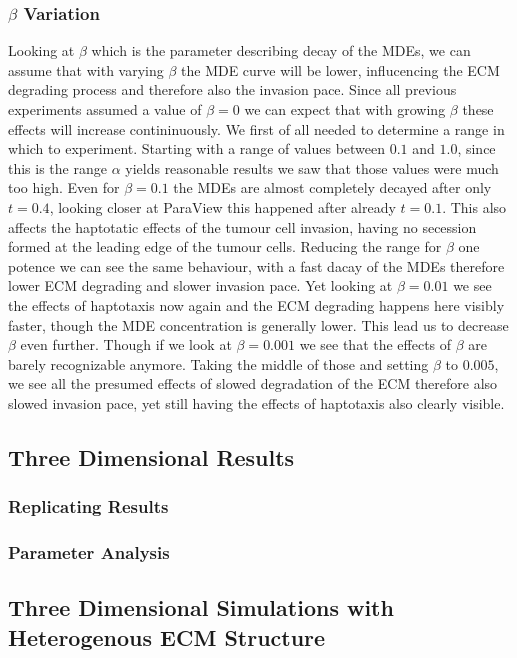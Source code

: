 \subsubsection*{$\beta$ Variation}

Looking at $\beta$ which is the parameter describing decay of the MDEs, we can assume that with varying $\beta$ the MDE curve will be lower, influcencing the ECM degrading process and therefore also the invasion pace. Since all previous experiments assumed a value of $\beta=0$ we can expect that with growing $\beta$ these effects will increase contininuously. We first of all needed to determine a range in which to experiment. Starting with a range of values between $0.1$ and $1.0$, since this is the range $\alpha$ yields reasonable results we saw that those values were much too high. Even for $\beta=0.1$ the MDEs are almost completely decayed after only $t=0.4$, looking closer at ParaView this happened after already $t=0.1$. This also affects the haptotatic effects of the tumour cell invasion, having no secession formed at the leading edge of the tumour cells. Reducing the range for $\beta$ one potence we can see the same behaviour, with a fast dacay of the MDEs therefore lower ECM degrading and slower invasion pace. Yet looking at $\beta=0.01$ we see the effects of haptotaxis now again and the ECM degrading happens here visibly faster, though the MDE concentration is generally lower. This lead us to decrease $\beta$ even further. Though if we look at $\beta=0.001$ we see that the effects of $\beta$ are barely recognizable anymore. Taking the middle of those and setting $\beta$ to $0.005$, we see all the presumed effects of slowed degradation of the ECM therefore also slowed invasion pace, yet still having the effects of haptotaxis also clearly visible.


\subsection{Three Dimensional Results}
\subsubsection{Replicating Results}
\subsubsection{Parameter Analysis}
\subsection{Three Dimensional Simulations with Heterogenous ECM Structure}